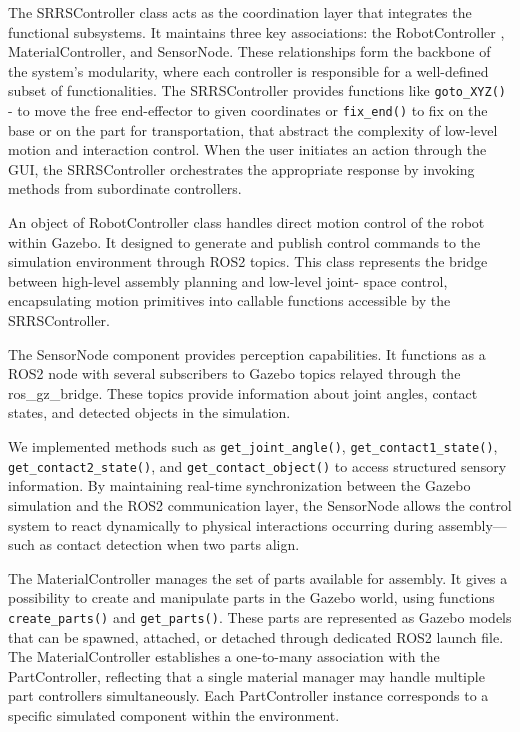 The SRRSController class acts as the coordination layer that integrates the 
functional subsystems. It maintains three key associations: the RobotController
, MaterialController, and SensorNode. These relationships form the backbone 
of the system’s modularity, where each controller is responsible for 
a well-defined subset of functionalities. The SRRSController provides functions like 
\texttt{goto\_XYZ()} - to move the free end-effector to given coordinates or 
\texttt{fix\_end()} to fix on the base or on the part for transportation,
that abstract the complexity of low-level motion and interaction control. 
When the user initiates an action through the GUI, the SRRSController 
orchestrates the appropriate response by invoking methods from subordinate controllers.

An object of RobotController class handles direct motion control of the robot 
within Gazebo. It designed  to generate and publish control commands to 
the simulation environment through ROS2 topics. 
This class represents the bridge between high-level assembly planning and low-level joint-
space control, encapsulating motion primitives into callable functions accessible 
by the SRRSController.

The SensorNode component provides perception capabilities. It functions as 
a ROS2 node with several subscribers to Gazebo topics relayed through the 
ros\_gz\_bridge. These topics provide information about joint angles, 
contact states, and detected objects in the simulation. 

We implemented methods such as \texttt{get\_joint\_angle()},
\texttt{get\_contact1\_state()}, \texttt{get\_contact2\_state()}, 
and \texttt{get\_contact\_object()} to access structured sensory information. 
By maintaining real-time synchronization between the Gazebo simulation and 
the ROS2 communication layer, the SensorNode allows the control system 
to react dynamically to physical interactions occurring during assembly—
such as contact detection when two parts align.

The MaterialController manages the set of parts available for 
assembly. It gives a possibility to create and manipulate parts in the Gazebo world, 
using functions \texttt{create\_parts()} and \texttt{get\_parts()}. These parts are represented 
as Gazebo models that can be spawned, attached, or detached through dedicated 
ROS2 launch file. The MaterialController establishes a one-to-many association 
with the PartController, reflecting that a single material manager may 
handle multiple part controllers simultaneously. Each PartController instance 
corresponds to a specific simulated component within the environment.

